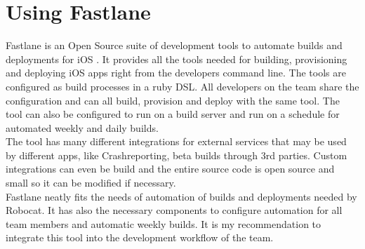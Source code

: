 \documentclass{ituthesis}
\begin{document}







\section{Using Fastlane}
\label{sec:using_fastlane}

Fastlane is an Open Source suite of development tools to automate builds and deployments for iOS \cite{Krause2015}. It provides all the tools needed for building, provisioning and deploying iOS apps right from the developers command line. The tools are configured as build processes in a ruby DSL. All developers on the team share the configuration and can all build, provision and deploy with the same tool. The tool can also be configured to run on a build server and run on a schedule for automated weekly and daily builds.\\

The tool has many different integrations for external services that may be used by different apps, like Crashreporting, beta builds through 3rd parties. Custom integrations can even be build and the entire source code is open source and small so it can be modified if necessary.\\

Fastlane neatly fits the needs of automation of builds and deployments needed by Robocat. It has also the necessary components to configure automation for all team members and automatic weekly builds. It is my recommendation to integrate this tool into the development workflow of the team.
\end{document}
